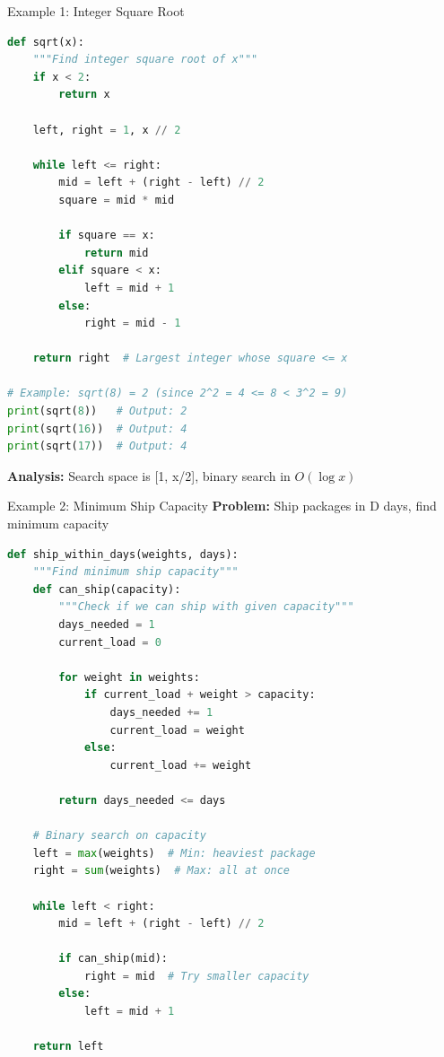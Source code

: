 \documentclass[aspectratio=169]{beamer}
\begin{document}
\begin{frame}[fragile]{Example 1: Integer Square Root}
\begin{lstlisting}[language=Python, basicstyle=\ttfamily\tiny]
def sqrt(x):
    """Find integer square root of x"""
    if x < 2:
        return x

    left, right = 1, x // 2

    while left <= right:
        mid = left + (right - left) // 2
        square = mid * mid

        if square == x:
            return mid
        elif square < x:
            left = mid + 1
        else:
            right = mid - 1

    return right  # Largest integer whose square <= x

# Example: sqrt(8) = 2 (since 2^2 = 4 <= 8 < 3^2 = 9)
print(sqrt(8))   # Output: 2
print(sqrt(16))  # Output: 4
print(sqrt(17))  # Output: 4
\end{lstlisting}

\textbf{Analysis:} Search space is [1, x/2], binary search in $O(\log x)$
\end{frame}

\begin{frame}[fragile]{Example 2: Minimum Ship Capacity}
\textbf{Problem:} Ship packages in D days, find minimum capacity

\begin{lstlisting}[language=Python, basicstyle=\ttfamily\tiny]
def ship_within_days(weights, days):
    """Find minimum ship capacity"""
    def can_ship(capacity):
        """Check if we can ship with given capacity"""
        days_needed = 1
        current_load = 0

        for weight in weights:
            if current_load + weight > capacity:
                days_needed += 1
                current_load = weight
            else:
                current_load += weight

        return days_needed <= days

    # Binary search on capacity
    left = max(weights)  # Min: heaviest package
    right = sum(weights)  # Max: all at once

    while left < right:
        mid = left + (right - left) // 2

        if can_ship(mid):
            right = mid  # Try smaller capacity
        else:
            left = mid + 1

    return left
\end{lstlisting}
\end{frame}
\end{document}
